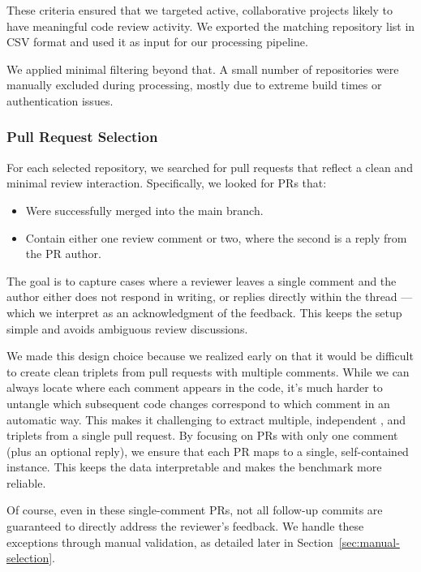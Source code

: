 These criteria ensured that we targeted active, collaborative projects likely to have meaningful
code review activity. We exported the matching repository list in CSV format and used it as input
for our processing pipeline.

We applied minimal filtering beyond that. A small number of repositories were manually excluded
during processing, mostly due to extreme build times or authentication issues.

\subsubsection{Pull Request Selection}
\label{sec:pr-selection}

For each selected repository, we searched for pull requests that reflect a clean and minimal review
interaction. Specifically, we looked for PRs that:

\begin{itemize}
	\item Were successfully merged into the main branch.
	\item Contain either one review comment or two, where the second is a reply from the PR author.
\end{itemize}

The goal is to capture cases where a reviewer leaves a single comment and the author either does not
respond in writing, or replies directly within the thread — which we interpret as an acknowledgment
of the feedback. This keeps the setup simple and avoids ambiguous review discussions.

We made this design choice because we realized early on that it would be difficult to create clean
triplets from pull requests with multiple comments. While we can always locate where each comment
appears in the code, it's much harder to untangle which subsequent code changes correspond to which
comment in an automatic way. This makes it challenging to extract multiple, independent \subCode,
\revComment and \revCode triplets from a single pull request. By focusing on PRs with only one
comment (plus an optional reply), we ensure that each PR maps to a single, self-contained instance.
This keeps the data interpretable and makes the benchmark more reliable.

Of course, even in these single-comment PRs, not all follow-up commits are guaranteed to directly
address the reviewer’s feedback. We handle these exceptions through manual validation, as detailed
later in Section~\ref{sec:manual-selection}.

